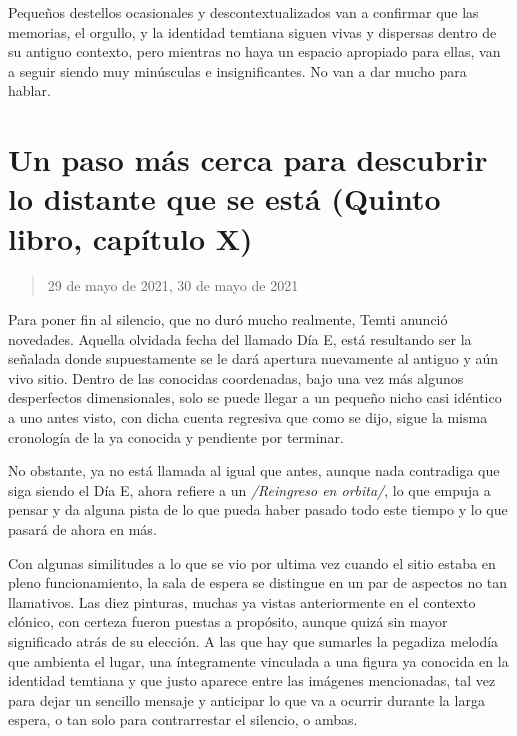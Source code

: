 \documentclass[
]{book}
\begin{document}
Pequeños destellos ocasionales y descontextualizados van a confirmar que las memorias, el orgullo, y la identidad temtiana siguen vivas y dispersas dentro de su antiguo contexto, pero mientras no haya un espacio apropiado para ellas, van a seguir siendo muy minúsculas e insignificantes. No van a dar mucho para hablar.

\hypertarget{un-paso-muxe1s-cerca-para-descubrir-lo-distante-que-se-estuxe1-quinto-libro-capuxedtulo-x}{%
\section{Un paso más cerca para descubrir lo distante que se está (Quinto libro, capítulo X)}\label{un-paso-muxe1s-cerca-para-descubrir-lo-distante-que-se-estuxe1-quinto-libro-capuxedtulo-x}}

\begin{quote}
29 de mayo de 2021, 30 de mayo de 2021
\end{quote}

Para poner fin al silencio, que no duró mucho realmente, Temti anunció novedades. Aquella olvidada fecha del llamado Día E, está resultando ser la señalada donde supuestamente se le dará apertura nuevamente al antiguo y aún vivo sitio. Dentro de las conocidas coordenadas, bajo una vez más algunos desperfectos dimensionales, solo se puede llegar a un pequeño nicho casi idéntico a uno antes visto, con dicha cuenta regresiva que como se dijo, sigue la misma cronología de la ya conocida y pendiente por terminar.

No obstante, ya no está llamada al igual que antes, aunque nada contradiga que siga siendo el Día E, ahora refiere a un \emph{/Reingreso en orbita/}, lo que empuja a pensar y da alguna pista de lo que pueda haber pasado todo este tiempo y lo que pasará de ahora en más.

Con algunas similitudes a lo que se vio por ultima vez cuando el sitio estaba en pleno funcionamiento, la sala de espera se distingue en un par de aspectos no tan llamativos. Las diez pinturas, muchas ya vistas anteriormente en el contexto clónico, con certeza fueron puestas a propósito, aunque quizá sin mayor significado atrás de su elección. A las que hay que sumarles la pegadiza melodía que ambienta el lugar, una íntegramente vinculada a una figura ya conocida en la identidad temtiana y que justo aparece entre las imágenes mencionadas, tal vez para dejar un sencillo mensaje y anticipar lo que va a ocurrir durante la larga espera, o tan solo para contrarrestar el silencio, o ambas.
\end{document}
